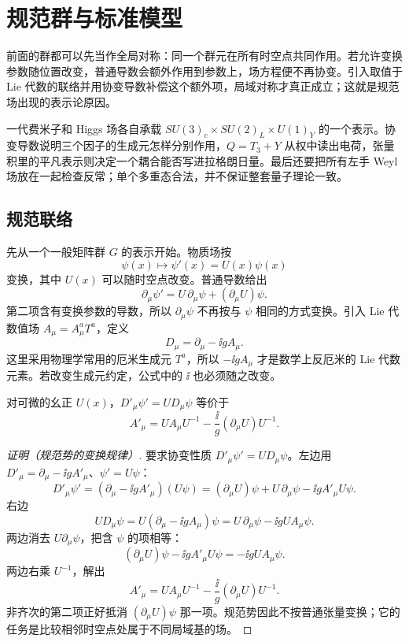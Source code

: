 \section{规范群与标准模型}
\label{chap:lie-standard-model}

前面的群都可以先当作全局对称：同一个群元在所有时空点共同作用。若允许变换参数随位置改变，普通导数会额外作用到参数上，场方程便不再协变。引入取值于 Lie 代数的联络并用协变导数补偿这个额外项，局域对称才真正成立；这就是规范场出现的表示论原因。

一代费米子和 Higgs 场各自承载 \(SU(3)_c\times SU(2)_L\times U(1)_Y\) 的一个表示。协变导数说明三个因子的生成元怎样分别作用，\(Q=T_3+Y\) 从权中读出电荷，张量积里的平凡表示则决定一个耦合能否写进拉格朗日量。最后还要把所有左手 Weyl 场放在一起检查反常；单个多重态合法，并不保证整套量子理论一致。

\subsection{规范联络}

先从一个一般矩阵群 $G$ 的表示开始。物质场按
\[
\psi(x)\longmapsto\psi'(x)=U(x)\psi(x)
\]
变换，其中 $U(x)$ 可以随时空点改变。普通导数给出
\[
\partial_\mu\psi'
=U\,\partial_\mu\psi+(\partial_\mu U)\psi.
\]
第二项含有变换参数的导数，所以 $\partial_\mu\psi$ 不再按与
$\psi$ 相同的方式变换。引入 Lie 代数值场
$A_\mu=A_\mu^aT^a$，定义
\begin{equation}
D_\mu=\partial_\mu-\ii gA_\mu .
\label{eq:gauge-covariant-derivative-general}
\end{equation}
这里采用物理学常用的厄米生成元 $T^a$，所以 $-\ii gA_\mu$ 才是数学上反厄米的 Lie 代数元素。若改变生成元约定，公式中的 $\ii$ 也必须随之改变。

\begin{proposition}[联络的非齐次变换]
对可微的幺正 $U(x)$，$D'_\mu\psi'=UD_\mu\psi$ 等价于
\[
 A'_\mu=UA_\mu U^{-1}-\frac{\ii}{g}(\partial_\mu U)U^{-1}.
\]
\end{proposition}
\begin{proof}[证明（规范势的变换规律）]
要求协变性质 $D'_\mu\psi'=U D_\mu\psi$。左边用 $D'_\mu=\partial_\mu-\ii gA'_\mu$、$\psi'=U\psi$：
\[
D'_\mu\psi'=(\partial_\mu-\ii gA'_\mu)(U\psi)=(\partial_\mu U)\psi+U\,\partial_\mu\psi-\ii gA'_\mu U\psi.
\]
右边
\[
U D_\mu\psi=U(\partial_\mu-\ii gA_\mu)\psi=U\,\partial_\mu\psi-\ii gU A_\mu\psi.
\]
两边消去 $U\partial_\mu\psi$，把含 $\psi$ 的项相等：
\[
(\partial_\mu U)\psi-\ii gA'_\mu U\psi=-\ii gU A_\mu\psi.
\]
两边右乘 $U^{-1}$，解出
\begin{equation}
A'_\mu=UA_\mu U^{-1}-\frac{\ii}{g}(\partial_\mu U)U^{-1}.
\label{eq:gauge-connection-transformation}
\end{equation}
非齐次的第二项正好抵消 $(\partial_\mu U)\psi$ 那一项。规范势因此不按普通张量变换；它的任务是比较相邻时空点处属于不同局域基的场。
\end{proof}

